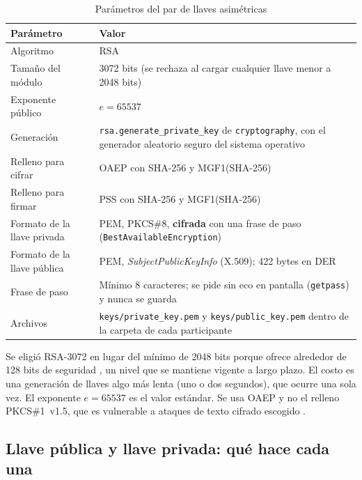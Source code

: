 \documentclass[11pt,a4paper]{article}
\theoremstyle{definition}
\theoremstyle{remark}
\newcommand{\code}[1]{\texttt{#1}}
\begin{document}
\begin{table}[H]
  \centering
  \caption{Parámetros del par de llaves asimétricas}
  \label{tab:rsa}
  \small
  \begin{tabularx}{\linewidth}{@{}P{4.6cm} Y@{}}
    \toprule
    \textbf{Parámetro} & \textbf{Valor} \\
    \midrule
    Algoritmo                   & RSA \\
    Tamaño del módulo           & 3072 bits (se rechaza al cargar cualquier llave menor a 2048 bits) \\
    Exponente público           & $e = 65537$ \\
    Generación                  & \code{rsa.generate\_private\_key} de \code{cryptography}, con el generador aleatorio seguro del sistema operativo \\
    Relleno para cifrar         & OAEP con SHA-256 y MGF1(SHA-256) \citep{rfc8017} \\
    Relleno para firmar         & PSS con SHA-256 y MGF1(SHA-256) \\
    Formato de la llave privada & PEM, PKCS\#8, \textbf{cifrada} con una frase de paso (\code{BestAvailableEncryption}) \\
    Formato de la llave pública & PEM, \emph{SubjectPublicKeyInfo} (X.509); 422 bytes en DER \\
    Frase de paso               & Mínimo 8 caracteres; se pide sin eco en pantalla (\code{getpass}) y nunca se guarda \\
    Archivos                    & \code{keys/private\_key.pem} y \code{keys/public\_key.pem} dentro de la carpeta de cada participante \\
    \bottomrule
  \end{tabularx}
\end{table}

Se eligió RSA-3072 en lugar del mínimo de 2048 bits porque ofrece alrededor
de 128 bits de seguridad \citep{nist80057}, un nivel que se mantiene vigente
a largo plazo. El costo es una generación de llaves algo más lenta (uno o
dos segundos), que ocurre una sola vez. El exponente $e = 65537$ es el valor
estándar. Se usa OAEP y no el relleno PKCS\#1~v1.5, que es vulnerable a
ataques de texto cifrado escogido \citep{bleichenbacher1998}.

\subsection{Llave pública y llave privada: qué hace cada una}
\label{subsec:publicaprivada}
\end{document}
